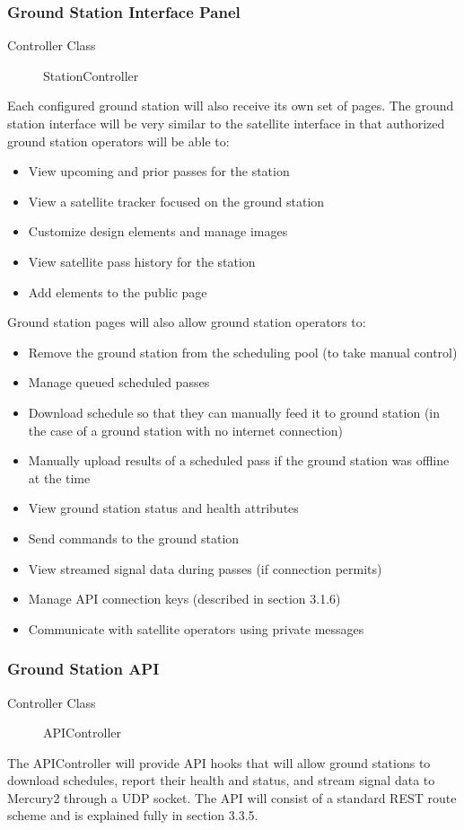 \documentclass{mxl-note}
\begin{document}
\subsubsection{Ground Station Interface Panel}
\begin{description}
	\item [Controller Class]StationController
\end{description}
Each configured ground station will also receive its own set of pages. The ground station interface will be very similar to the satellite interface in that authorized ground station operators will be able to:
\begin{itemize}
	\item View upcoming and prior passes for the station
	\item View a satellite tracker focused on the ground station
	\item Customize design elements and manage images
	\item View satellite pass history for the station
	\item Add elements to the public page
\end{itemize}
Ground station pages will also allow ground station operators to:
\begin{itemize}
	\item Remove the ground station from the scheduling pool (to take manual control)
	\item Manage queued scheduled passes
	\item Download schedule so that they can manually feed it to ground station (in the case of a ground station with no internet connection)
	\item Manually upload results of a scheduled pass if the ground station was offline at the time
	\item View ground station status and health attributes
	\item Send commands to the ground station
	\item View streamed signal data during passes (if connection permits)
	\item Manage API connection keys (described in section 3.1.6)
	\item Communicate with satellite operators using private messages
\end{itemize}

\subsubsection{Ground Station API}
\begin{description}
	\item [Controller Class]APIController
\end{description}
The APIController will provide API hooks that will allow ground stations to download schedules, report their health and status, and stream signal data to Mercury2 through a UDP socket. The API will consist of a standard REST route scheme and is explained fully in section 3.3.5.
\end{document}

